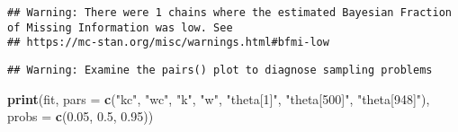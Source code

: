 \documentclass[
]{article}
\newenvironment{Shaded}{\begin{snugshade}}{\end{snugshade}}
\newcommand{\AttributeTok}[1]{\textcolor[rgb]{0.13,0.29,0.53}{#1}}
\newcommand{\FloatTok}[1]{\textcolor[rgb]{0.00,0.00,0.81}{#1}}
\newcommand{\FunctionTok}[1]{\textcolor[rgb]{0.13,0.29,0.53}{\textbf{#1}}}
\newcommand{\NormalTok}[1]{#1}
\newcommand{\StringTok}[1]{\textcolor[rgb]{0.31,0.60,0.02}{#1}}
\begin{document}
\begin{verbatim}
## Warning: There were 1 chains where the estimated Bayesian Fraction of Missing Information was low. See
## https://mc-stan.org/misc/warnings.html#bfmi-low
\end{verbatim}

\begin{verbatim}
## Warning: Examine the pairs() plot to diagnose sampling problems
\end{verbatim}

\begin{Shaded}
\begin{Highlighting}[]
\FunctionTok{print}\NormalTok{(fit, }\AttributeTok{pars =} \FunctionTok{c}\NormalTok{(}\StringTok{"kc"}\NormalTok{, }\StringTok{"wc"}\NormalTok{, }\StringTok{"k"}\NormalTok{, }\StringTok{"w"}\NormalTok{, }\StringTok{"theta[1]"}\NormalTok{, }\StringTok{"theta[500]"}\NormalTok{, }
                    \StringTok{"theta[948]"}\NormalTok{), }\AttributeTok{probs =} \FunctionTok{c}\NormalTok{(}\FloatTok{0.05}\NormalTok{, }\FloatTok{0.5}\NormalTok{, }\FloatTok{0.95}\NormalTok{))}
\end{Highlighting}
\end{Shaded}
\end{document}
